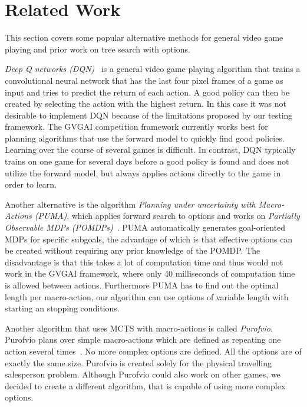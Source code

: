 \section{Related Work}
\label{sec:related}
This section covers some popular alternative methods for general video game
playing and prior work on tree search with options. 

\emph{Deep Q networks (DQN)}~\cite{mnih2013playing} is a general video game playing algorithm that
trains a convolutional neural network that has the last four pixel frames of a
game as input and tries to predict the return of each action. A good policy can
then be created by selecting the action with the highest return. In this case it
was not desirable to implement DQN because of the limitations proposed by our
testing framework.  The GVGAI competition framework currently works best for
planning algorithms that use the forward model to quickly find good policies.
Learning over the course of several games is difficult. In contrast, DQN
typically trains on one game for several days before a good policy is found and
does not utilize the forward model, but always applies actions directly to the
game in order to learn.

Another alternative is the algorithm \emph{Planning under uncertainty with
Macro-Actions (PUMA)}, which applies forward search to options and works on
\emph{Partially Observable MDPs (POMDPs)}~\cite{he2010puma}. PUMA automatically
generates goal-oriented MDPs for specific subgoals, the advantage of which is
that effective options can be created without requiring any prior knowledge of
the POMDP\@. The disadvantage is that this takes a lot of computation time and
thus would not work in the GVGAI framework, where only 40 milliseconds of
computation time is allowed between actions. Furthermore PUMA has to find out
the optimal length per macro-action, our algorithm can use options of variable
length with starting an stopping conditions.

Another algorithm that uses MCTS with macro-actions is called \emph{Purofvio}.
Purofvio plans over simple macro-actions which are defined as repeating one
action several times~\cite{powley2012monte}. No more complex options are
defined.  All the options are of exactly the same size. Purofvio is created
solely for the physical travelling salesperson problem. Although Purofvio could
also work on other games, we decided to create a different algorithm, that is
capable of using more complex options.
